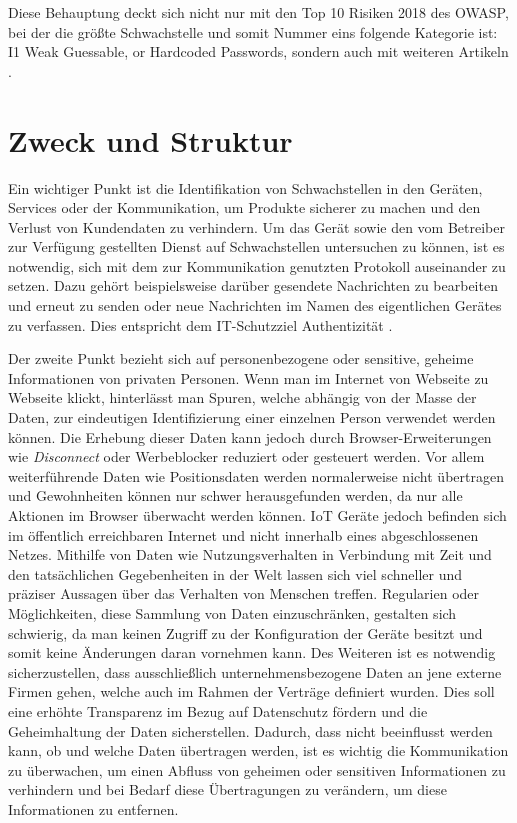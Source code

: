 Diese Behauptung deckt sich nicht nur mit den Top 10 Risiken 2018 des \ac{OWASP}, bei der die größte Schwachstelle und somit Nummer eins folgende Kategorie ist: \glqq I1 Weak Guessable, or Hardcoded Passwords\grqq{}, sondern auch mit weiteren Artikeln \cite{guzman_2019,eckstein_2018}.

\section{Zweck und Struktur}

    Ein wichtiger Punkt ist die Identifikation von Schwachstellen in den Geräten, Services oder der Kommunikation, um Produkte sicherer zu machen und den Verlust von Kundendaten zu verhindern.
    Um das Gerät sowie den vom Betreiber zur Verfügung gestellten Dienst auf Schwachstellen untersuchen zu können, ist es notwendig, sich mit dem zur Kommunikation genutzten Protokoll auseinander zu setzen. Dazu gehört beispielsweise darüber gesendete Nachrichten zu bearbeiten und erneut zu senden oder neue Nachrichten im Namen des eigentlichen Gerätes zu verfassen. Dies entspricht dem IT-Schutzziel Authentizität \cite{Bedner2010}.
    
    Der zweite Punkt bezieht sich auf personenbezogene oder sensitive, geheime Informationen von privaten Personen.
    Wenn man im Internet von Webseite zu Webseite klickt, hinterlässt man Spuren, welche abhängig von der Masse der Daten, zur eindeutigen Identifizierung einer einzelnen Person verwendet werden können. %
    Die Erhebung dieser Daten kann jedoch durch Browser-Erweiterungen wie \emph{Disconnect} oder Werbeblocker reduziert oder gesteuert werden. Vor allem weiterführende Daten wie Positionsdaten werden normalerweise nicht übertragen und Gewohnheiten können nur schwer herausgefunden werden, da nur alle Aktionen im Browser überwacht werden können.
    \ac{IoT} Geräte jedoch befinden sich im öffentlich erreichbaren Internet und nicht innerhalb eines abgeschlossenen Netzes. Mithilfe von Daten wie Nutzungsverhalten in Verbindung mit Zeit und den tatsächlichen Gegebenheiten in der Welt lassen sich viel schneller und präziser Aussagen über das Verhalten von Menschen treffen. %
    Regularien oder Möglichkeiten, diese Sammlung von Daten einzuschränken, gestalten sich schwierig, da man keinen Zugriff zu der Konfiguration der Geräte besitzt und somit keine Änderungen daran vornehmen kann.
    Des Weiteren ist es notwendig sicherzustellen, dass ausschließlich unternehmensbezogene Daten an jene externe Firmen gehen, welche auch im Rahmen der Verträge definiert wurden. Dies soll eine erhöhte Transparenz im Bezug auf Datenschutz fördern und die Geheimhaltung der Daten sicherstellen.
    Dadurch, dass nicht beeinflusst werden kann, ob und welche Daten übertragen werden, ist es wichtig die Kommunikation zu überwachen, um einen Abfluss von geheimen oder sensitiven Informationen zu verhindern und bei Bedarf diese Übertragungen zu verändern, um diese Informationen zu entfernen.
    
